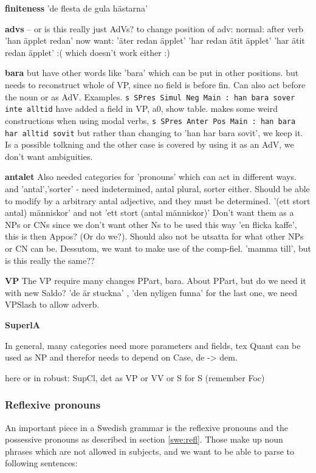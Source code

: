\documentclass{report}
\begin{document}
\textbf{finiteness}
 'de flesta de gula hästarna'

\textbf{advs}
-- or is this really just AdVs? 
to change position of adv:
normal: after verb 'han äpplet redan'
now want: 'äter redan äpplet'
          'har redan ätit äpplet' 
          'har ätit redan äpplet' :( which doesn't work either :)

\textbf{bara}
but have other words like 'bara' which can be put in other positions.
  but needs to reconstruct whole of VP, since no field is before fin.
  Can also act before the noun or as AdV. Examples.
\verb|s SPres Simul Neg Main : han bara sover inte alltid|
  have added a field in VP, a0, show table.
  makes some weird constructions when using modal verbs, 
  \verb|s SPres Anter Pos Main : han bara har alltid sovit|
  but rather than changing to 'han har bara sovit', we keep it. Is a possible
  tolkning and the other case is covered by using it as an AdV, we don't want
  ambiguities.

\textbf{antalet}
Also needed categories for 'pronouns' which can act in different ways.
and 'antal','sorter' - need indetermined, antal plural, sorter either.
Should be able to modify by a arbitrary antal adjective, and they must be determined.
'(ett stort antal) människor' and not 'ett stort (antal människor)'
Don't want them as a NPs or CNs since we don't want other Ns to be used this way
'en flicka kaffe', this is then Appos? (Or do we?). Should also not be utsatta for what other
NPs or CN can be. Dessutom, we want to make use of the comp-fiel. 'mamma till', but is this really
the same??

\textbf{VP}
The VP require many changes PPart, bara.
About PPart, but do we need it with new Saldo? 'de är stuckna' , 'den nyligen funna'
for the last one, we need VPSlash to allow adverb.

\textbf{SuperlA}

In general, many categories need more parameters and fields, tex Quant can be used as NP
and therefor needs to depend on Case, de -> dem.

here or in robust: SupCl, det as VP or VV or S for S (remember Foc)
\subsubsection{Reflexive pronouns}
An important piece in a Swedish grammar is the reflexive pronouns and
the possessive pronouns as described in section \ref{swe:refl}.
Those make up noun phrases which are not allowed in subjects, 
and we want to be able to parse to following sentences:
\end{document}
